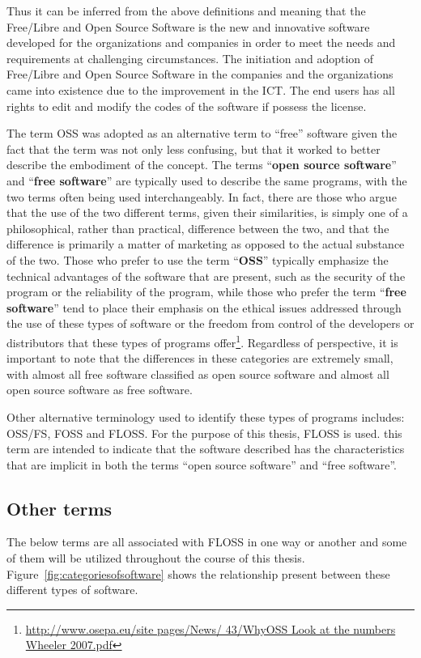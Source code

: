  Thus it can be inferred from the above definitions and meaning that the Free/Libre and Open Source Software is the new and innovative software developed for the organizations and companies in order to meet the needs and requirements at challenging circumstances. The initiation and adoption of Free/Libre and Open Source Software in the companies and the organizations came into existence due to the improvement in the \ac{ICT}. The end users has all rights to edit and modify the codes of the software if possess the license.
 
  The term OSS was adopted as an alternative term to ``free'' software given the fact that the term was not only less confusing, but that it worked to better describe the embodiment of the concept. The terms ``\textbf{open source software}'' and ``\textbf{free software}'' are typically used to describe the same programs, with the two terms often being used interchangeably. In fact, there are those who argue that the use of the two different terms, given their similarities, is simply one of a philosophical, rather than practical, difference between the two, and that the difference is primarily a matter of marketing as opposed to the actual substance of the two. Those who prefer to use the term ``\textbf{OSS}'' typically emphasize the technical advantages of the software that are present, such as the security of the program or the reliability of the program, while those who prefer the term ``\textbf{free software}'' tend to place their emphasis on the ethical issues addressed through the use of these types of software or the freedom from control of the developers or distributors that these types of programs offer\footnote{\url{http://www.osepa.eu/site pages/News/ 43/WhyOSS Look at the numbers Wheeler 2007.pdf}}. Regardless of perspective, it is important to note that the differences in these categories are extremely small, with almost all free software classified as open source software and almost all open source software as free software. 
 
 Other alternative terminology used to identify these types of programs includes:   \ac{OSS/FS}, \ac{FOSS} and  \ac{FLOSS}.  For the purpose of this thesis, \ac{FLOSS} is used. this term are intended to indicate that the software described has the characteristics that are implicit in both the terms ``open source software'' and ``free software''.
 
  \subsection{Other terms}
  The below terms are all associated with FLOSS in one way or another and some of them will be utilized throughout the course of this thesis. Figure~\ref{fig:categoriesofsoftware} shows the relationship present between these different types of software.
